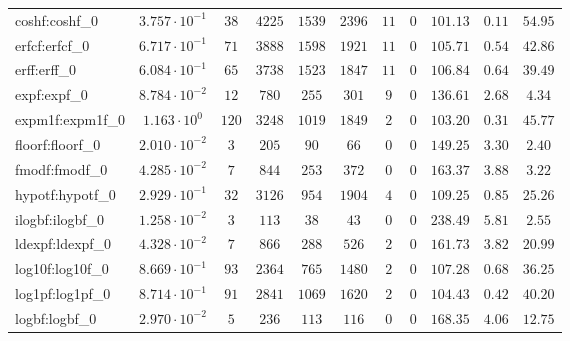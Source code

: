 \begin{tabular}{|l|c|c|c|c|c|c|c|c|c|c|}
coshf:coshf\_0               & $ 3.757 \cdot 10^{-1} $ & $ 38     $ & $ 4225  $ & $ 1539  $ & $ 2396  $ & $ 11  $ & $ 0 $ & $ 101.13      $ & $ 0.11    $ & $ 54.95   $ \\
erfcf:erfcf\_0               & $ 6.717 \cdot 10^{-1} $ & $ 71     $ & $ 3888  $ & $ 1598  $ & $ 1921  $ & $ 11  $ & $ 0 $ & $ 105.71      $ & $ 0.54    $ & $ 42.86   $ \\
erff:erff\_0                 & $ 6.084 \cdot 10^{-1} $ & $ 65     $ & $ 3738  $ & $ 1523  $ & $ 1847  $ & $ 11  $ & $ 0 $ & $ 106.84      $ & $ 0.64    $ & $ 39.49   $ \\
expf:expf\_0                 & $ 8.784 \cdot 10^{-2} $ & $ 12     $ & $ 780   $ & $ 255   $ & $ 301   $ & $ 9   $ & $ 0 $ & $ 136.61      $ & $ 2.68    $ & $ 4.34    $ \\
expm1f:expm1f\_0             & $ 1.163 \cdot 10^{0}  $ & $ 120    $ & $ 3248  $ & $ 1019  $ & $ 1849  $ & $ 2   $ & $ 0 $ & $ 103.20      $ & $ 0.31    $ & $ 45.77   $ \\
floorf:floorf\_0             & $ 2.010 \cdot 10^{-2} $ & $ 3      $ & $ 205   $ & $ 90    $ & $ 66    $ & $ 0   $ & $ 0 $ & $ 149.25      $ & $ 3.30    $ & $ 2.40    $ \\
fmodf:fmodf\_0               & $ 4.285 \cdot 10^{-2} $ & $ 7      $ & $ 844   $ & $ 253   $ & $ 372   $ & $ 0   $ & $ 0 $ & $ 163.37      $ & $ 3.88    $ & $ 3.22    $ \\
hypotf:hypotf\_0             & $ 2.929 \cdot 10^{-1} $ & $ 32     $ & $ 3126  $ & $ 954   $ & $ 1904  $ & $ 4   $ & $ 0 $ & $ 109.25      $ & $ 0.85    $ & $ 25.26   $ \\
ilogbf:ilogbf\_0             & $ 1.258 \cdot 10^{-2} $ & $ 3      $ & $ 113   $ & $ 38    $ & $ 43    $ & $ 0   $ & $ 0 $ & $ 238.49      $ & $ 5.81    $ & $ 2.55    $ \\
ldexpf:ldexpf\_0             & $ 4.328 \cdot 10^{-2} $ & $ 7      $ & $ 866   $ & $ 288   $ & $ 526   $ & $ 2   $ & $ 0 $ & $ 161.73      $ & $ 3.82    $ & $ 20.99   $ \\
log10f:log10f\_0             & $ 8.669 \cdot 10^{-1} $ & $ 93     $ & $ 2364  $ & $ 765   $ & $ 1480  $ & $ 2   $ & $ 0 $ & $ 107.28      $ & $ 0.68    $ & $ 36.25   $ \\
log1pf:log1pf\_0             & $ 8.714 \cdot 10^{-1} $ & $ 91     $ & $ 2841  $ & $ 1069  $ & $ 1620  $ & $ 2   $ & $ 0 $ & $ 104.43      $ & $ 0.42    $ & $ 40.20   $ \\
logbf:logbf\_0               & $ 2.970 \cdot 10^{-2} $ & $ 5      $ & $ 236   $ & $ 113   $ & $ 116   $ & $ 0   $ & $ 0 $ & $ 168.35      $ & $ 4.06    $ & $ 12.75   $ \\

\end{tabular}
